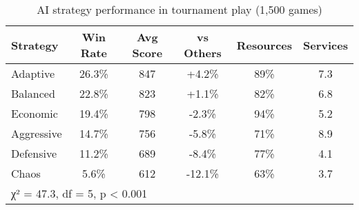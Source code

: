\begin{table}[h]
\centering
\caption{AI strategy performance in tournament play (1,500 games)}
\label{tab:strategies}
\begin{tabular}{@{}lccccc@{}}
\toprule
Strategy & Win Rate & Avg Score & vs Others & Resources & Services \\
\midrule
Adaptive & 26.3\% & 847 & +4.2\% & 89\% & 7.3 \\
Balanced & 22.8\% & 823 & +1.1\% & 82\% & 6.8 \\
Economic & 19.4\% & 798 & -2.3\% & 94\% & 5.2 \\
Aggressive & 14.7\% & 756 & -5.8\% & 71\% & 8.9 \\
Defensive & 11.2\% & 689 & -8.4\% & 77\% & 4.1 \\
Chaos & 5.6\% & 612 & -12.1\% & 63\% & 3.7 \\
\bottomrule
\multicolumn{6}{l}{\footnotesize χ² = 47.3, df = 5, p < 0.001}
\end{tabular}
\end{table}